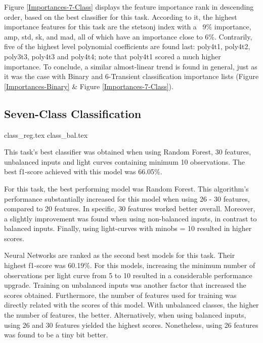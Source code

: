 Figure \ref{Importances-7-Class} displays the feature importance rank in descending order, based on the best classifier for this task. 
According to it, the highest importance features for this task are the
stetson\textunderscore j index with a ~9\% importance, amp, std, sk, and mad, all of which have an importance close to 6\%. Contrarily, five of the highest level polynomial coefficients are found last: poly4\textunderscore t1, poly4\textunderscore t2, poly3\textunderscore t3, poly4\textunderscore t3 and poly4\textunderscore t4; note that poly4\textunderscore t1 scored a much higher importance. To conclude, a similar almost-linear trend is found in general, just as it was the case with Binary and 6-Transient classification importance lists (Figure \ref{Importances-Binary} \& Figure \ref{Importances-7-Class}).



\subsection{Seven-Class Classification}

{class_reg.tex}
{class_bal.tex}


This task's best classifier was obtained when using Random Forest, 30 features, unbalanced inputs and light curves containing minimum 10 observations. The best f1-score achieved with this model was 66.05\%.

For this task, the best performing model was Random Forest. This algorithm's performance substantially increased for this model when using 26 - 30 features, compared to 20 features. In specific, 30 features worked better overall. Moreover, a slightly improvement was found when using non-balanced inputs, in contrast to balanced inputs. Finally, using light-curves with min\textunderscore obs = 10 resulted in higher scores.

Neural Networks are ranked as the second best models for this task. Their highest f1-score was 60.19\%. For this models, increasing the minimum number of observations per light curve from 5 to 10 resulted in a considerable performance upgrade. Training on unbalanced inputs was another factor that increased the scores obtained. Furthermore, the number of features used for training was directly related with the scores of this model. With unbalanced classes, the higher the number of features, the better. Alternatively, when using balanced inputs, using 26 and 30 features yielded the highest scores. Nonetheless, using 26 features was found to be a tiny bit better.

